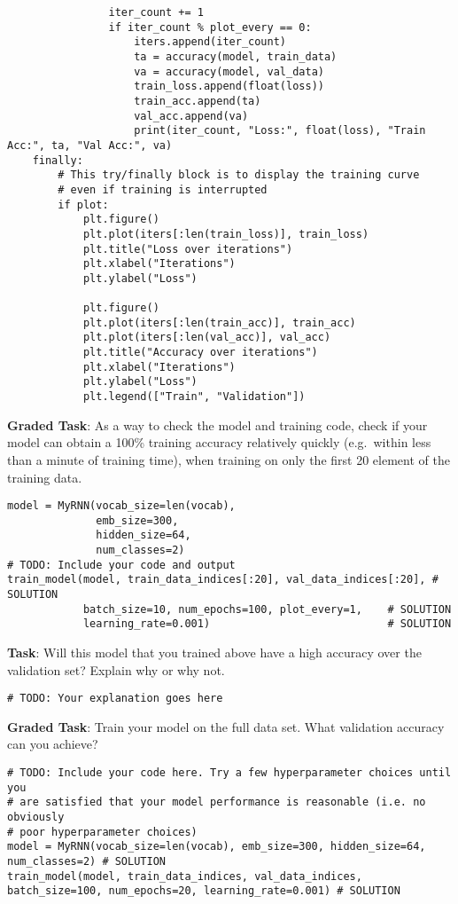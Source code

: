 \documentclass[
  letterpaper,
  DIV=11,
  numbers=noendperiod]{scrartcl}
\begin{document}
\begin{verbatim}
                iter_count += 1
                if iter_count % plot_every == 0:
                    iters.append(iter_count)
                    ta = accuracy(model, train_data)
                    va = accuracy(model, val_data)
                    train_loss.append(float(loss))
                    train_acc.append(ta)
                    val_acc.append(va)
                    print(iter_count, "Loss:", float(loss), "Train Acc:", ta, "Val Acc:", va)
    finally:
        # This try/finally block is to display the training curve
        # even if training is interrupted
        if plot:
            plt.figure()
            plt.plot(iters[:len(train_loss)], train_loss)
            plt.title("Loss over iterations")
            plt.xlabel("Iterations")
            plt.ylabel("Loss")

            plt.figure()
            plt.plot(iters[:len(train_acc)], train_acc)
            plt.plot(iters[:len(val_acc)], val_acc)
            plt.title("Accuracy over iterations")
            plt.xlabel("Iterations")
            plt.ylabel("Loss")
            plt.legend(["Train", "Validation"])
\end{verbatim}

\textbf{Graded Task}: As a way to check the model and training code,
check if your model can obtain a 100\% training accuracy relatively
quickly (e.g.~within less than a minute of training time), when training
on only the first 20 element of the training data.

\begin{verbatim}
model = MyRNN(vocab_size=len(vocab),
              emb_size=300,
              hidden_size=64,
              num_classes=2)
# TODO: Include your code and output 
train_model(model, train_data_indices[:20], val_data_indices[:20], # SOLUTION
            batch_size=10, num_epochs=100, plot_every=1,    # SOLUTION
            learning_rate=0.001)                            # SOLUTION
\end{verbatim}

\textbf{Task}: Will this model that you trained above have a high
accuracy over the validation set? Explain why or why not.

\begin{verbatim}
# TODO: Your explanation goes here
\end{verbatim}

\textbf{Graded Task}: Train your model on the full data set. What
validation accuracy can you achieve?

\begin{verbatim}
# TODO: Include your code here. Try a few hyperparameter choices until you
# are satisfied that your model performance is reasonable (i.e. no obviously
# poor hyperparameter choices)
model = MyRNN(vocab_size=len(vocab), emb_size=300, hidden_size=64, num_classes=2) # SOLUTION
train_model(model, train_data_indices, val_data_indices, batch_size=100, num_epochs=20, learning_rate=0.001) # SOLUTION
\end{verbatim}
\end{document}
